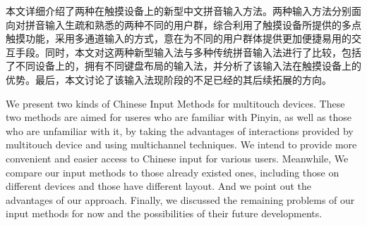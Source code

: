 

\cleardoublepage
\begin{cabstract}

  本文详细介绍了两种在触摸设备上的新型中文拼音输入方法。两种输入方法分别面向对拼音输入生疏和熟悉的两种不同的用户群，综合利用了触摸设备所提供的多点触摸功能，采用多通道输入的方式，意在为不同的用户群体提供更加便捷易用的交互手段。同时，本文对这两种新型输入法与多种传统拼音输入法进行了比较，包括了不同设备上的，拥有不同键盘布局的输入法，并分析了该输入法在触摸设备上的优势。最后，本文讨论了该输入法现阶段的不足已经的其后续拓展的方向。

\end{cabstract}

\cleardoublepage
\begin{eabstract}

  We present two kinds of Chinese Input Methods for multitouch devices. These two methods are aimed for useres who are familiar with Pinyin, as well as those who are unfamiliar with it, by taking the advantages of interactions provided by multitouch device and using multichannel techniques. We intend to provide more convenient and easier access to Chinese input for various users. Meanwhile, We compare our input methods to those already existed ones, including those on different devices and those have different layout. And we point out the advantages of our approach. Finally, we discussed the remaining problems of our input methods for now and the possibilities of their future developments.

\end{eabstract}
